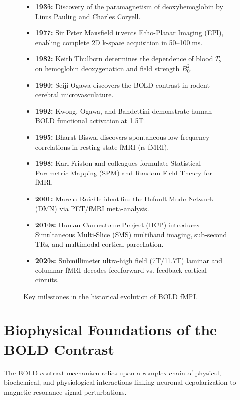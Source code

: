 \documentclass[11pt,a4paper]{article}
\begin{document}
\begin{figure}[htbp]
\centering
\begin{tcolorbox}[colback=teal!5!white,colframe=teal!60!black,title=\textbf{Chronological Timeline of Functional Neuroimaging Milestones},width=\linewidth]
\small
\begin{itemize}[leftmargin=1.5em]
    \item \textbf{1936:} Discovery of the paramagnetism of deoxyhemoglobin by Linus Pauling and Charles Coryell.
    \item \textbf{1977:} Sir Peter Mansfield invents Echo-Planar Imaging (EPI), enabling complete 2D k-space acquisition in 50--100 ms.
    \item \textbf{1982:} Keith Thulborn determines the dependence of blood $T_2$ on hemoglobin deoxygenation and field strength $B_0^2$.
    \item \textbf{1990:} Seiji Ogawa discovers the BOLD contrast in rodent cerebral microvasculature.
    \item \textbf{1992:} Kwong, Ogawa, and Bandettini demonstrate human BOLD functional activation at 1.5T.
    \item \textbf{1995:} Bharat Biswal discovers spontaneous low-frequency correlations in resting-state fMRI (rs-fMRI).
    \item \textbf{1998:} Karl Friston and colleagues formulate Statistical Parametric Mapping (SPM) and Random Field Theory for fMRI.
    \item \textbf{2001:} Marcus Raichle identifies the Default Mode Network (DMN) via PET/fMRI meta-analysis.
    \item \textbf{2010s:} Human Connectome Project (HCP) introduces Simultaneous Multi-Slice (SMS) multiband imaging, sub-second TRs, and multimodal cortical parcellation.
    \item \textbf{2020s:} Submillimeter ultra-high field (7T/11.7T) laminar and columnar fMRI decodes feedforward vs. feedback cortical circuits.
\end{itemize}
\end{tcolorbox}
\caption{Key milestones in the historical evolution of BOLD fMRI.}
\label{fig:milestones}
\end{figure}

\section{Biophysical Foundations of the BOLD Contrast}
The BOLD contrast mechanism relies upon a complex chain of physical, biochemical, and physiological interactions linking neuronal depolarization to magnetic resonance signal perturbations.
\end{document}
